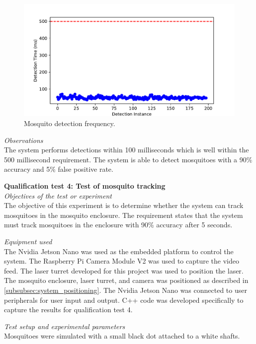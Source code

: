 \begin{figure}[h]
  \centering
  \includegraphics[width=\textwidth]{figures/results/detection_frequency.pdf}
  \caption{Mosquito detection frequency.}
  \label{fig:detection_frequency}
\end{figure}

\textit{Observations}\\
The system performs detections within 100 milliseconds which is well within the 500 millisecond requirement. The system is able to detect mosquitoes with a 90\% accuracy and 5\% false positive rate.

\FloatBarrier
\textbf{Qualification test 4: Test of mosquito tracking}\\
\textit{Objectives of the test or experiment}\\
The objective of this experiment is to determine whether the system can track mosquitoes in the mosquito enclosure. The requirement states that the system must track mosquitoes in the enclosure with 90\% accuracy after 5 seconds.

\textit{Equipment used}\\
The Nvidia Jetson Nano was used as the embedded platform to control the system. The Raspberry Pi Camera Module V2 was used to capture the video feed. The laser turret developed for this project was used to position the laser. The mosquito enclosure, laser turret, and camera was positioned as described in \autoref{subsubsec:system_positioning}. The Nvidia Jetson Nano was connected to user peripherals for user input and output. C++ code was developed specifically to capture the results for qualification test 4.

\textit{Test setup and experimental parameters}\\
Mosquitoes were simulated with a small black dot attached to a white shafts.

